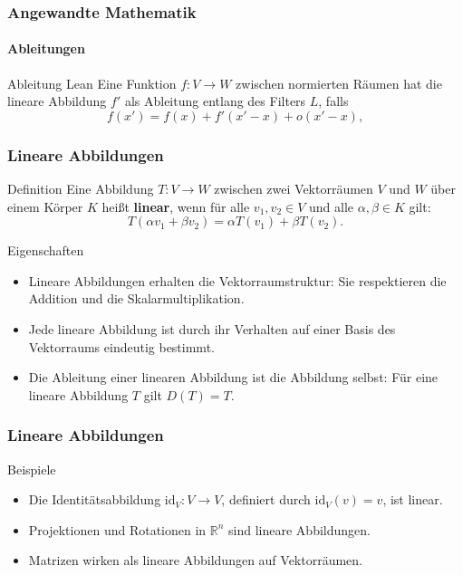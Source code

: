 \documentclass{beamer}
\begin{document}
    \begin{frame}
        \frametitle{Angewandte Mathematik}
        \framesubtitle{Ableitungen}
 
        \begin{block}{Ableitung Lean}
            Eine Funktion \( f: V \to  W \) zwischen normierten Räumen hat die lineare Abbildung \( f' \) als Ableitung entlang des Filters \( L \), falls
            \[
            f(x') = f(x) + f'(x' - x) + o(x' - x),
            \]
            \end{block}
            
        \end{frame}




    \begin{frame}
        \frametitle{Lineare Abbildungen}
    
        \begin{block}{Definition}
            Eine Abbildung \( T: V \to W \) zwischen zwei Vektorräumen \( V \) und \( W \) über einem Körper \( K \) heißt \textbf{linear}, wenn für alle \( v_1, v_2 \in V \) und alle \( \alpha, \beta \in K \) gilt:
            \[
            T(\alpha v_1 + \beta v_2) = \alpha T(v_1) + \beta T(v_2).
            \]
        \end{block}
    
        \begin{block}{Eigenschaften}
            \begin{itemize}
                \item Lineare Abbildungen erhalten die Vektorraumstruktur: Sie respektieren die Addition und die Skalarmultiplikation.
                \item Jede lineare Abbildung ist durch ihr Verhalten auf einer Basis des Vektorraums eindeutig bestimmt.
                \item Die Ableitung einer linearen Abbildung ist die Abbildung selbst: Für eine lineare Abbildung \( T \) gilt \( D(T) = T \).
            \end{itemize}
        \end{block}
    
  
        
    \end{frame}
    
    \begin{frame}
        \frametitle{Lineare Abbildungen}
    
    
        \begin{block}{Beispiele}
            \begin{itemize}
                \item Die Identitätsabbildung \( \text{id}_V: V \to V \), definiert durch \( \text{id}_V(v) = v \), ist linear.
                \item Projektionen und Rotationen in \( \mathbb{R}^n \) sind lineare Abbildungen.
                \item Matrizen wirken als lineare Abbildungen auf Vektorräumen.
            \end{itemize}
        \end{block}
        
    \end{frame}
    
\end{document}
